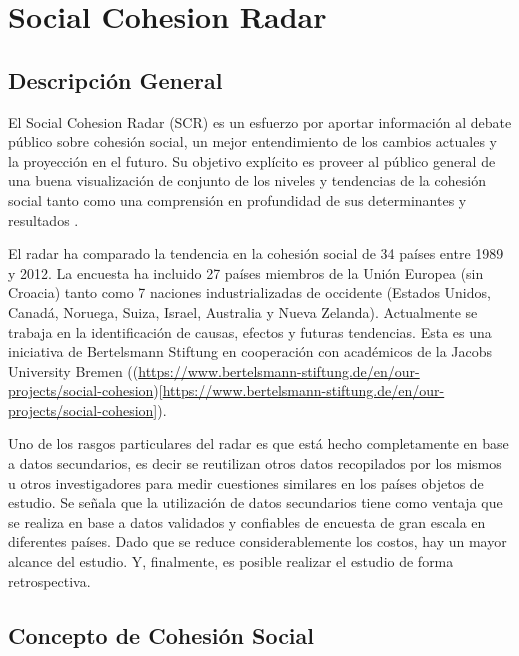 \documentclass[
  12pt,
]{book}
\begin{document}
\hypertarget{social-cohesion-radar}{%
\chapter{Social Cohesion Radar}\label{social-cohesion-radar}}

\hypertarget{descripciuxf3n-general}{%
\section{Descripción General}\label{descripciuxf3n-general}}

El Social Cohesion Radar (SCR) es un esfuerzo por aportar información al
debate público sobre cohesión social, un mejor entendimiento de los
cambios actuales y la proyección en el futuro. Su objetivo explícito es
proveer al público general de una buena visualización de conjunto de los
niveles y tendencias de la cohesión social tanto como una comprensión en
profundidad de sus determinantes y resultados \citep{dragolov_Social_2016}.

El radar ha comparado la tendencia en la cohesión social de 34 países
entre 1989 y 2012. La encuesta ha incluido 27 países miembros de la
Unión Europea (sin Croacia) tanto como 7 naciones industrializadas de
occidente (Estados Unidos, Canadá, Noruega, Suiza, Israel, Australia y
Nueva Zelanda). Actualmente se trabaja en la identificación de causas, efectos y futuras
tendencias. Esta es una iniciativa de Bertelsmann Stiftung en
cooperación con académicos de la Jacobs University Bremen ((\url{https://www.bertelsmann-stiftung.de/en/our-projects/social-cohesion}){[}\url{https://www.bertelsmann-stiftung.de/en/our-projects/social-cohesion}{]}).

Uno de los rasgos particulares del radar es que está hecho completamente
en base a datos secundarios, es decir se reutilizan otros datos
recopilados por los mismos u otros investigadores para medir cuestiones
similares en los países objetos de estudio. Se señala que la utilización
de datos secundarios tiene como ventaja que se realiza en base a datos
validados y confiables de encuesta de gran escala en diferentes países.
Dado que se reduce considerablemente los costos, hay un mayor alcance
del estudio. Y, finalmente, es posible realizar el estudio de forma
retrospectiva.

\hypertarget{concepto-de-cohesiuxf3n-social}{%
\section{Concepto de Cohesión Social}\label{concepto-de-cohesiuxf3n-social}}
\end{document}
